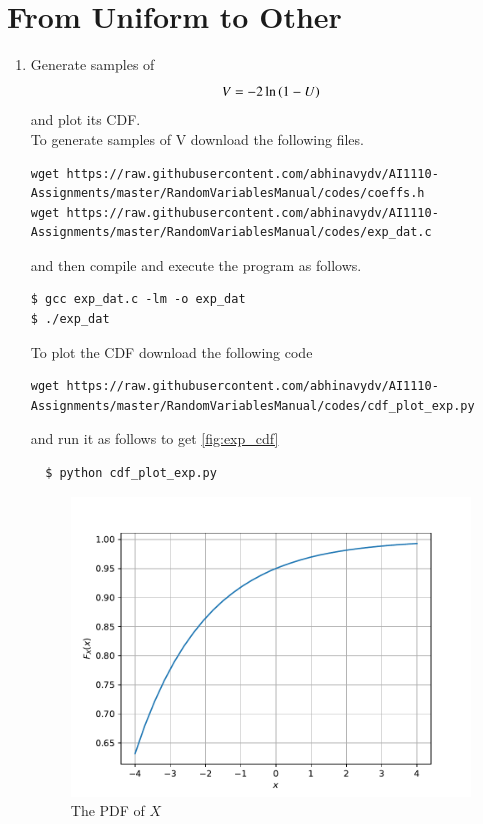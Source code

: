 \documentclass[journal,12pt,twocolumn]{IEEEtran}
\renewcommand\thesection{\arabic{section}}
\begin{document}
\section{From Uniform to Other}
\begin{enumerate}[label=\thesection.\arabic*
        ,ref=\thesection.\theenumi]
    \item
          Generate samples of
          \begin{equation}
              V = -2\ln\left(1-U\right)
          \end{equation}
          and plot its CDF.\\
          \solution To generate samples of V download the following files.
          \begin{lstlisting}
wget https://raw.githubusercontent.com/abhinavydv/AI1110-Assignments/master/RandomVariablesManual/codes/coeffs.h
wget https://raw.githubusercontent.com/abhinavydv/AI1110-Assignments/master/RandomVariablesManual/codes/exp_dat.c
        \end{lstlisting}

          and then compile and execute the program as follows.
          \begin{lstlisting}
$ gcc exp_dat.c -lm -o exp_dat
$ ./exp_dat
        \end{lstlisting}

          To plot the CDF download the following code
          \begin{lstlisting}
wget https://raw.githubusercontent.com/abhinavydv/AI1110-Assignments/master/RandomVariablesManual/codes/cdf_plot_exp.py
\end{lstlisting}
          and run it as follows to get \autoref{fig:exp_cdf}
          \begin{lstlisting}
  $ python cdf_plot_exp.py
\end{lstlisting}

          \begin{figure}
              \centering
              \includegraphics[width=\columnwidth]{./figs/exp_cdf}
              \caption{The PDF of $X$}
              \label{fig:exp_cdf}
          \end{figure}


\end{enumerate}
\end{document}
